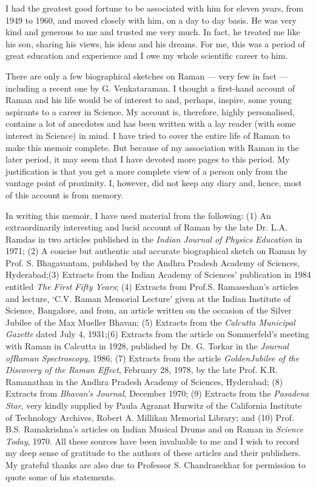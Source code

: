 I had the greatest good fortune to be associated with him for eleven years, from 1949 to 1960, and moved closely with him, on a day to day basis. He was very kind and generous to me and trusted me very much. In fact, he treated me like his son, sharing his views, his ideas and his dreams. For me, this was a period of great education and experience and I owe my whole scientific career to him.

There are only a few biographical sketches on Raman --- very few in fact --- including a recent one by G. Venkataraman. I thought a first-hand account of Raman and his life would be of interest to and, perhaps, inspire, some young aspirants to a career in Science. My account is, therefore, highly personalised, contains a lot of anecdotes and has been written with a lay reader (with some interest in Science) in mind. I have tried to cover the entire life of Raman to make this memoir complete. But because of my association with Raman in the later period, it may seem that I have devoted more pages to this period. My justification is that you get a more complete view of a person only from the vantage point of proximity. I, however, did not keep any diary and, hence, most of this account is from memory.

In writing this memoir, I have used material from the following: (1) An extraordinarily interesting and lucid account of Raman by the late Dr. L.A. Ramdas in two articles published in the {\em Indian Journal of Physics Education} in 1971; (2) A concise but authentic and accurate biographical sketch on Raman by Prof. S. Bhagavantam, published by the Andhra Pradesh Academy of Sciences, Hyderabad;\break (3) Extracts from the Indian Academy of Sciences' publication in 1984 entitled {\em The First Fifty Years}; (4) Extracts from Prof.\break S. Ramaseshan's articles and lecture, `C.V. Raman Memorial Lecture' given at the Indian Institute of Science, Bangalore, and from, an article written on the occasion of the Silver Jubilee of the Max Mueller Bhavan; (5) Extracts from the {\em Calcutta Municipal Gazette} dated July 4, 1931;\break (6) Extracts from the article on Sommerfeld's meeting with Raman in Calcutta in 1928, published by Dr. G. Torkar in the {\em Journal of\break Raman Spectroscopy}, 1986; (7) Extracts from the article {\em Golden\break Jubilee of the Discovery of the Raman Effect}, February 28, 1978, by the late Prof. K.R. Ramanathan in the Andhra Pradesh Academy of Sciences, Hyderabad; (8) Extracts from {\em Bhavan's Journal}, December 1970; (9) Extracts from the {\em Pasadena Star}, very kindly supplied by Paula Agranat Hurwitz of the California Institute of Technology Archives, Robert A. Millikan Memorial Library; and (10) Prof. B.S. Ramakrishna's articles on Indian Musical Drums and on Raman in {\em Science Today}, 1970. All these sources have been invaluable to me and I wish to record my deep sense of gratitude to the authors of these articles and their publishers. My grateful thanks are also due to Professor S. Chandrasekhar for permission to quote some of his statements.

